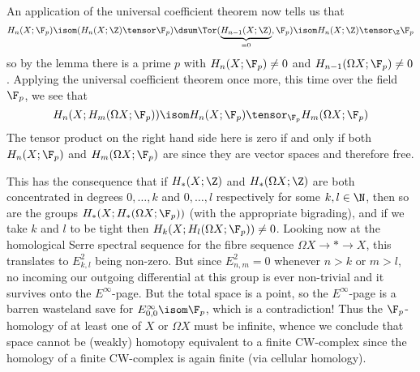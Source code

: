 \begin{solution}
	An application of the universal coefficient theorem now tells us that
	\begin{equation*}
		H_n(X; \F_p) \isom (H_n(X; \Z) \tensor \F_p) \dsum \Tor(\underbrace{H_{n - 1}(X; \Z)}_{= 0}, \F_p) \isom H_n(X; \Z) \tensor_{\Z} \F_p
	\end{equation*}
	so by the lemma there is a prime $p$ with $H_n(X; \F_p) \neq 0$ and $H_{n - 1}(\Omega X; \F_p) \neq 0$. Applying the universal coefficient theorem once more, this time over the field $\F_p$, we see that 
	\begin{equation*}
		H_n(X; H_m(\Omega X; \F_p)) \isom H_n(X; \F_p) \tensor_{\F_p} H_m(\Omega X; \F_p)
	\end{equation*}
	The tensor product on the right hand side here is zero if and only if both $H_n(X; \F_p)$ and $H_m(\Omega X; \F_p)$ are since they are vector spaces and therefore free.

	This has the consequence that if $H_*(X; \Z)$ and $H_*(\Omega X; \Z)$ are both concentrated in degrees $0, \ldots, k$ and $0, \ldots, l$ respectively for some $k, l \in \N$, then so are the groups $H_*(X; H_*(\Omega X; \F_p))$ (with the appropriate bigrading), and if we take $k$ and $l$ to be tight then $H_k(X; H_l(\Omega X; \F_p)) \neq 0$.
	Looking now at the homological Serre spectral sequence for the fibre sequence $\Omega X \to * \to X$, this translates to $E^2_{k, l}$ being non-zero.
	But since $E^2_{n, m} = 0$ whenever $n > k$ or $m > l$, no incoming our outgoing differential at this group is ever non-trivial and it survives onto the $E^\infty$-page.
	But the total space is a point, so the $E^\infty$-page is a barren wasteland save for $E^\infty_{0, 0} \isom \F_p$, which is a contradiction!
	Thus the $\F_p$-homology of at least one of $X$ or $\Omega X$ must be infinite, whence we conclude that space cannot be (weakly) homotopy equivalent to a finite CW-complex since the homology of a finite CW-complex is again finite (via cellular homology).
\end{solution}

